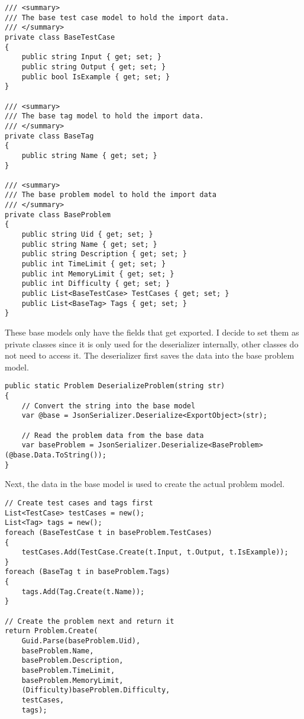 \documentclass[report.tex]{subfiles}
\begin{document}
\begin{verbatim}
/// <summary>
/// The base test case model to hold the import data.
/// </summary>
private class BaseTestCase
{
    public string Input { get; set; }
    public string Output { get; set; }
    public bool IsExample { get; set; }
}

/// <summary>
/// The base tag model to hold the import data.
/// </summary>
private class BaseTag
{
    public string Name { get; set; }
}

/// <summary>
/// The base problem model to hold the import data
/// </summary>
private class BaseProblem
{
    public string Uid { get; set; }
    public string Name { get; set; }
    public string Description { get; set; }
    public int TimeLimit { get; set; }
    public int MemoryLimit { get; set; }
    public int Difficulty { get; set; }
    public List<BaseTestCase> TestCases { get; set; }
    public List<BaseTag> Tags { get; set; }
}
\end{verbatim}

These base models only have the fields that get exported. I decide to set them as private classes since it is only used for the deserializer internally, other classes do not need to access it. The deserializer first saves the data into the base problem model.

\begin{verbatim}
public static Problem DeserializeProblem(string str)
{
    // Convert the string into the base model
    var @base = JsonSerializer.Deserialize<ExportObject>(str);

    // Read the problem data from the base data
    var baseProblem = JsonSerializer.Deserialize<BaseProblem>(@base.Data.ToString());
}
\end{verbatim}

Next, the data in the base model is used to create the actual problem model.

\begin{verbatim}
// Create test cases and tags first
List<TestCase> testCases = new();
List<Tag> tags = new();
foreach (BaseTestCase t in baseProblem.TestCases)
{
    testCases.Add(TestCase.Create(t.Input, t.Output, t.IsExample));
}
foreach (BaseTag t in baseProblem.Tags)
{
    tags.Add(Tag.Create(t.Name));
}

// Create the problem next and return it
return Problem.Create(
    Guid.Parse(baseProblem.Uid),
    baseProblem.Name,
    baseProblem.Description,
    baseProblem.TimeLimit,
    baseProblem.MemoryLimit,
    (Difficulty)baseProblem.Difficulty,
    testCases,
    tags);
\end{verbatim}
\end{document}
